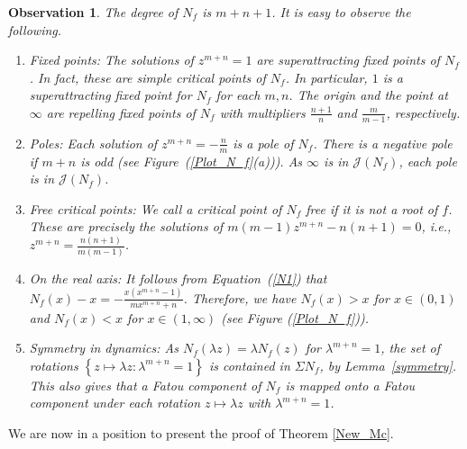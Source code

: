 \documentclass[12pt]{article}
\newtheorem{obs}[thm]{Observation}
\numberwithin{equation}{section}
\begin{document}
\begin{obs}\label{prop_N_Mc}
The degree of $N_f$ is $m+n+1$. It is easy to observe the following.
	\begin{enumerate}
		\item Fixed points: The solutions of $z^{m+n}=1$ are superattracting fixed points of $N_f$. In fact, these are simple critical points of $N_f$. In particular, $1$ is a superattracting fixed point for $N_f$ for each $m,n$. The origin and the point at $\infty$ are repelling fixed points of $N_f$ with multipliers $\frac{n+1}{n}$ and $\frac{m}{m-1}$, respectively.
		\item Poles:  Each solution of $z^{m+n}=-\frac{n}{m}$ is a pole of $N_f$. There is a negative pole if $m+n$ is odd (see Figure~(\ref{Plot_N_f}(a))). As $\infty$ is in $\mathcal{J}(N_f)$, each pole is in $\mathcal{J}(N_f)$.
		\item Free critical points: We call a critical point of $N_f$ free if it is not a root of $f$. These are precisely the solutions of  $m(m-1) z^{m+n}-n(n+1)=0$, i.e., $z^{m+n}=\frac{n(n+1)}{m(m-1)}$.
		\item  On the real axis: 
		It follows from Equation~(\ref{N1}) that $N_f(x)-x=-\frac{x\left(x^{m+n}-1\right)}{m x^{m+n}+n}$. Therefore, we have $N_f(x)>x$ for $x \in (0,1)$ and $N_f(x)<x$ for $x \in (1,\infty)$ (see Figure (\ref{Plot_N_f})).
		\item \label{obs-symmetry} Symmetry in dynamics: As $N_f(\lambda z)=\lambda N_f(z)$ for $\lambda^{m+n}=1$, the set of rotations $\left\{z \mapsto \lambda z: \lambda^{m+n}=1\right\}$ is contained in $  \Sigma N_f$, by Lemma~\ref{symmetry}. This also gives that a Fatou component of $N_f$ is mapped onto a Fatou component under each rotation $z \mapsto \lambda z$ with $\lambda^{m+n}=1$.	\end{enumerate}
\end{obs} 
We are now in a position to present the proof of Theorem \ref{New_Mc}.
\end{document}
